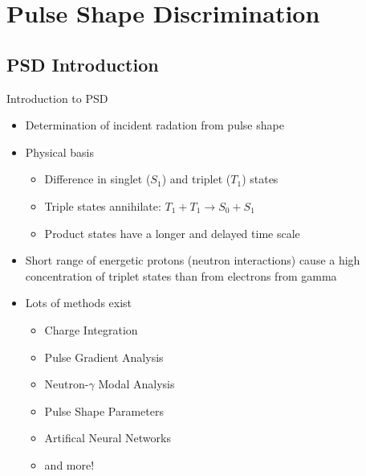 
% 
%
\section{Pulse Shape Discrimination}


\subsection{PSD Introduction}
\begin{frame}{Introduction to PSD}
	\begin{itemize}
		\small
		\item Determination of incident radation from pulse shape
		\item Physical basis
		\begin{itemize}
			\tiny
			\item Difference in singlet ($S_1$) and triplet ($T_1$) states \cite{zaitseva_plastic_2012}
			\item Triple states annihilate: $T_1 + T_1 \to S_0 + S_1$
			\item Product states have a longer and delayed time scale
		\end{itemize}
		\small
		\item Short range of energetic protons (neutron interactions) cause a high concentration of triplet states than from electrons from gamma
		\item Lots of methods exist \cite{ambers_hybrid_2011, gamage_comparison_2011, miller_digital_2007}
		\begin{itemize}
			\tiny
			\item Charge Integration
			\item Pulse Gradient Analysis
			\item Neutron-$\gamma$ Modal Analysis
			\item Pulse Shape Parameters
			\item Artifical Neural Networks
			\item and more!
		\end{itemize}
	\end{itemize}
\end{frame}
